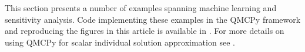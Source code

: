 \documentclass[graybox]{svmult}
\begin{document}
This section presents a number of examples spanning machine learning and sensitivity analysis. Code implementing these examples in the QMCPy framework and reproducing the figures in this article is available in \cite{vectorized_qmc_demo_notebook}. For more details on using QMCPy for scalar individual solution approximation see \cite{QMCSoftware}.

% 
\end{document}
